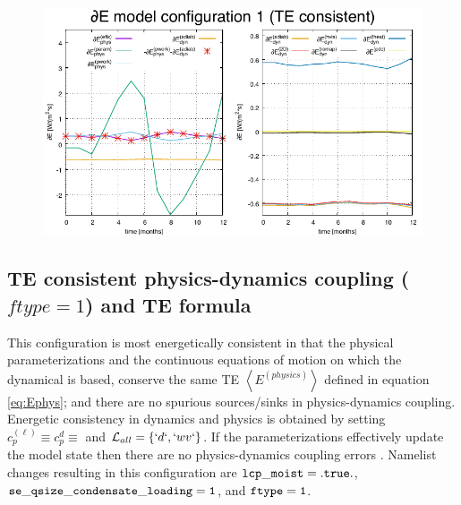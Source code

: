 \documentclass{agujournal}
\begin{document}
 \begin{figure}[h]
 \centering
 \includegraphics[width=35pc]{figs/dEdt.pdf}
 \caption{{}}
 \label{fig:dEdt(t)}
  \end{figure}




\subsection{TE consistent physics-dynamics coupling ($ftype=1$) and TE formula}
This configuration is most energetically consistent in that the physical parameterizations and the continuous equations of motion on which the dynamical is based, conserve the same TE $\left< E^{(physics)}\right>$ defined in equation \eqref{eq:Ephys}; and there are no spurious sources/sinks in physics-dynamics coupling. Energetic consistency in dynamics and physics is obtained by setting $c_p^{(\ell)}\equiv c_p^{d}\equiv$ and $\mathcal{L}_{all}=\left\{ `d`,`wv`\right\}$. If the parameterizations effectively update the model state then there are no physics-dynamics coupling errors \citep[$\tt{ftype=1}$ setup described in detail in ][]{LetAl2018JAMES}. Namelist changes resulting in this configuration are $\tt{lcp\_moist}=.true.$, $\tt{se\_qsize\_condensate\_loading=1}$, and $\tt{ftype=1}$.
\end{document}
